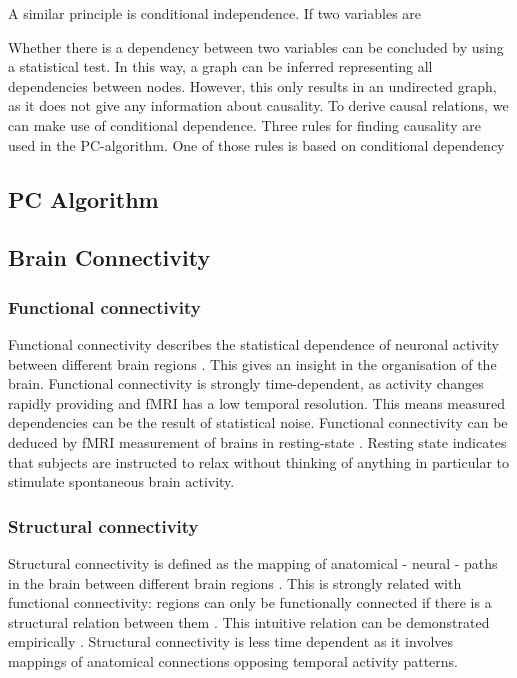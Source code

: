 \documentclass[a4paper, 10pt, english, twocolumn]{article}
\begin{document}
A similar principle is conditional independence. If two variables are 

Whether there is a dependency between two variables can be concluded by using a statistical test.
In this way, a graph can be inferred representing all dependencies between nodes.
However, this only results in an undirected graph, as it does not give any information about causality.
To derive causal relations, we can make use of conditional dependence.
Three rules for finding causality are used in the PC-algorithm.
One of those rules is based on conditional dependency 


\subsection{PC Algorithm}

\subsection{Brain Connectivity}

\subsubsection*{Functional connectivity}
Functional connectivity describes the statistical dependence of neuronal activity between different brain regions \cite{friston1993functional}.
This gives an insight in the organisation of the brain.
Functional connectivity is strongly time-dependent, as activity changes rapidly providing and fMRI has a low temporal resolution.
This means measured dependencies can be the result of statistical noise.
Functional connectivity can be deduced by fMRI measurement of brains in resting-state \cite{Lowe2000, doria2010, Bullmore2009}.
Resting state indicates that subjects are instructed to relax without thinking of anything in particular to stimulate spontaneous brain activity.

\subsubsection*{Structural connectivity}
Structural connectivity is defined as the mapping of anatomical - neural - paths in the brain between different brain regions \cite{friston1994}.
This is strongly related with functional connectivity: regions can only be functionally connected if there is a structural relation between them \cite{cabral2012}.
This intuitive relation can be demonstrated empirically \cite{vandenheuvel2009}.
Structural connectivity is less time dependent as it involves mappings of anatomical connections opposing temporal activity patterns.
\end{document}
